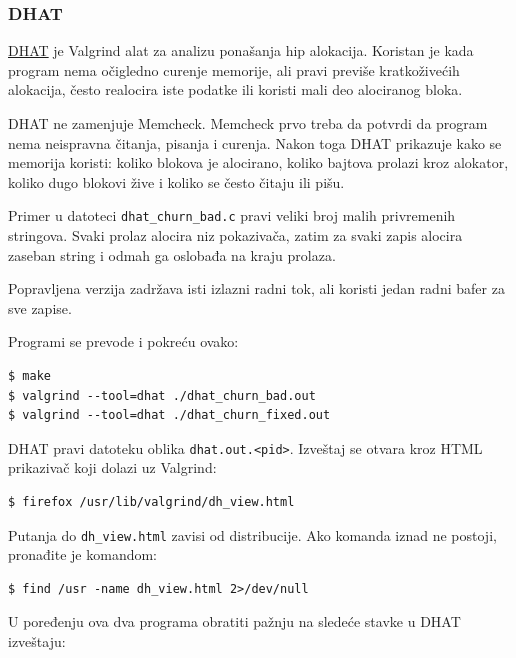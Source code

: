 \subsubsection{DHAT}\label{valgrind-dhat}

\href{https://valgrind.org/docs/manual/dh-manual.html}{DHAT} je Valgrind alat za analizu ponašanja hip alokacija. Koristan je kada program nema očigledno curenje memorije, ali pravi previše kratkoživećih alokacija, često realocira iste podatke ili koristi mali deo alociranog bloka.

DHAT ne zamenjuje Memcheck. Memcheck prvo treba da potvrdi da program nema neispravna čitanja, pisanja i curenja. Nakon toga DHAT prikazuje kako se memorija koristi: koliko blokova je alocirano, koliko bajtova prolazi kroz alokator, koliko dugo blokovi žive i koliko se često čitaju ili pišu.

Primer u datoteci \texttt{dhat\_churn\_bad.c} pravi veliki broj malih privremenih stringova. Svaki prolaz alocira niz pokazivača, zatim za svaki zapis alocira zaseban string i odmah ga oslobađa na kraju prolaza.


Popravljena verzija zadržava isti izlazni radni tok, ali koristi jedan radni bafer za sve zapise.


Programi se prevode i pokreću ovako:

\begin{verbatim}
$ make
$ valgrind --tool=dhat ./dhat_churn_bad.out
$ valgrind --tool=dhat ./dhat_churn_fixed.out
\end{verbatim}

DHAT pravi datoteku oblika \texttt{dhat.out.\textless{}pid\textgreater{}}. Izveštaj se otvara kroz HTML prikazivač koji dolazi uz Valgrind:

\begin{verbatim}
$ firefox /usr/lib/valgrind/dh_view.html
\end{verbatim}

Putanja do \texttt{dh\_view.html} zavisi od distribucije. Ako komanda iznad ne postoji, pronađite je komandom:

\begin{verbatim}
$ find /usr -name dh_view.html 2>/dev/null
\end{verbatim}

U poređenju ova dva programa obratiti pažnju na sledeće stavke u DHAT izveštaju:

